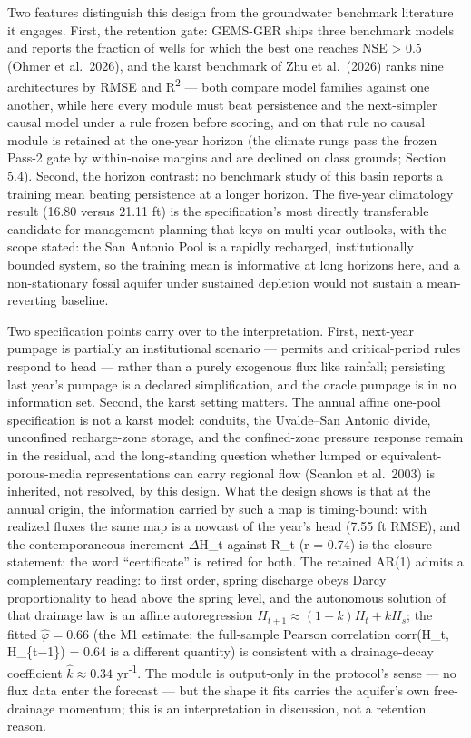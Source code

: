 \documentclass[11pt]{article}
\begin{document}
Two features distinguish this design from the groundwater benchmark
literature it engages. First, the retention gate: GEMS-GER ships three
benchmark models and reports the fraction of wells for which the best
one reaches NSE \textgreater{} 0.5 (Ohmer et al.~2026), and the karst
benchmark of Zhu et al.~(2026) ranks nine architectures by RMSE and R\textsuperscript{2}
--- both compare model families against one another, while here every
module must beat persistence and the next-simpler causal model under a
rule frozen before scoring, and on that rule no causal module is
retained at the one-year horizon (the climate rungs pass the frozen
Pass-2 gate by within-noise margins and are declined on class grounds;
Section 5.4). Second, the horizon contrast: no benchmark study of this
basin reports a training mean beating persistence at a longer horizon.
The five-year climatology result (16.80 versus 21.11 ft) is the
specification's most directly transferable candidate for management
planning that keys on multi-year outlooks, with the scope stated: the
San Antonio Pool is a rapidly recharged, institutionally bounded system,
so the training mean is informative at long horizons here, and a
non-stationary fossil aquifer under sustained depletion would not
sustain a mean-reverting baseline.

Two specification points carry over to the interpretation. First,
next-year pumpage is partially an institutional scenario --- permits and
critical-period rules respond to head --- rather than a purely exogenous
flux like rainfall; persisting last year's pumpage is a declared
simplification, and the oracle pumpage is in no information set. Second,
the karst setting matters. The annual affine one-pool specification is
not a karst model: conduits, the Uvalde--San Antonio divide, unconfined
recharge-zone storage, and the confined-zone pressure response remain in
the residual, and the long-standing question whether lumped or
equivalent-porous-media representations can carry regional flow (Scanlon
et al.~2003) is inherited, not resolved, by this design. What the design
shows is that at the annual origin, the information carried by such a
map is timing-bound: with realized fluxes the same map is a nowcast of
the year's head (7.55 ft RMSE), and the contemporaneous increment \ensuremath{\Delta}H\_t
against R\_t (r = 0.74) is the closure statement; the word
``certificate'' is retired for both. The retained AR(1) admits a
complementary reading: to first order, spring discharge obeys Darcy
proportionality to head above the spring level, and the autonomous
solution of that drainage law is an affine autoregression
\(H_{t+1} \approx (1-k)H_t + k H_s\); the fitted \(\hat\varphi = 0.66\)
(the M1 estimate; the full-sample Pearson correlation corr(H\_t,
H\_\{t\ensuremath{-}1\}) = 0.64 is a different quantity) is consistent with a
drainage-decay coefficient \(\hat k \approx 0.34\) yr\textsuperscript{-1}. The module is
output-only in the protocol's sense --- no flux data enter the forecast
--- but the shape it fits carries the aquifer's own free-drainage
momentum; this is an interpretation in discussion, not a retention
reason.
\end{document}
